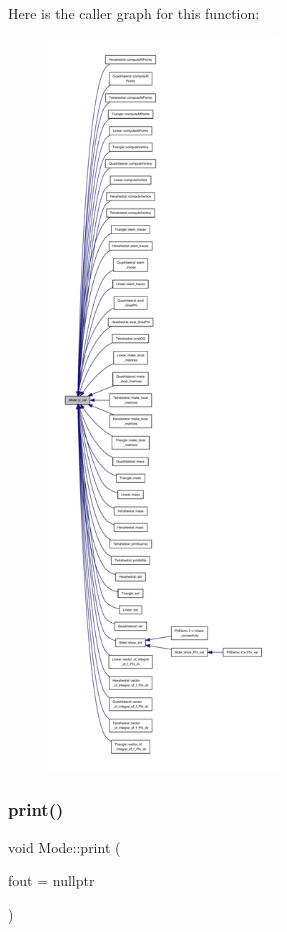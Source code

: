 Here is the caller graph for this function\+:
\nopagebreak
\begin{figure}[H]
\begin{center}
\leavevmode
\includegraphics[height=550pt]{classMode_adb05ad8eecd616f8d68de8bff4de78d1_icgraph}
\end{center}
\end{figure}
\mbox{\label{classMode_ad5e7c7fc1712619979296b514d2418cf}} 
\subsubsection{\texorpdfstring{print()}{print()}}
{\footnotesize\ttfamily void Mode\+::print (\begin{DoxyParamCaption}\item[{F\+I\+LE $\ast$}]{fout = {\ttfamily nullptr} }\end{DoxyParamCaption})\hspace{0.3cm}{\ttfamily [inline]}}



